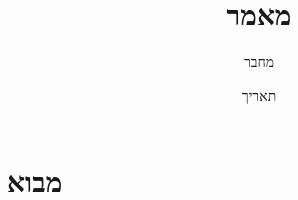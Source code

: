 \documentclass{article}
\title{מאמר}
\author{מחבר}
\date{תאריך}
\begin{document}
\maketitle

\section{מבוא}
\end{document}
